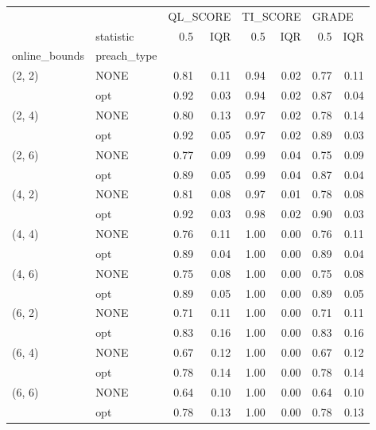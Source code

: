 \begin{tabular}{llrrrrrr}
\toprule
       & {} & \multicolumn{2}{l}{QL\_SCORE} & \multicolumn{2}{l}{TI\_SCORE} & \multicolumn{2}{l}{GRADE} \\
       & statistic &      0.5 &  IQR &      0.5 &  IQR &   0.5 &  IQR \\
online\_bounds & preach\_type &          &      &          &      &       &      \\
\midrule
(2, 2) & NONE &     0.81 & 0.11 &     0.94 & 0.02 &  0.77 & 0.11 \\
       & opt &     0.92 & 0.03 &     0.94 & 0.02 &  0.87 & 0.04 \\
(2, 4) & NONE &     0.80 & 0.13 &     0.97 & 0.02 &  0.78 & 0.14 \\
       & opt &     0.92 & 0.05 &     0.97 & 0.02 &  0.89 & 0.03 \\
(2, 6) & NONE &     0.77 & 0.09 &     0.99 & 0.04 &  0.75 & 0.09 \\
       & opt &     0.89 & 0.05 &     0.99 & 0.04 &  0.87 & 0.04 \\
(4, 2) & NONE &     0.81 & 0.08 &     0.97 & 0.01 &  0.78 & 0.08 \\
       & opt &     0.92 & 0.03 &     0.98 & 0.02 &  0.90 & 0.03 \\
(4, 4) & NONE &     0.76 & 0.11 &     1.00 & 0.00 &  0.76 & 0.11 \\
       & opt &     0.89 & 0.04 &     1.00 & 0.00 &  0.89 & 0.04 \\
(4, 6) & NONE &     0.75 & 0.08 &     1.00 & 0.00 &  0.75 & 0.08 \\
       & opt &     0.89 & 0.05 &     1.00 & 0.00 &  0.89 & 0.05 \\
(6, 2) & NONE &     0.71 & 0.11 &     1.00 & 0.00 &  0.71 & 0.11 \\
       & opt &     0.83 & 0.16 &     1.00 & 0.00 &  0.83 & 0.16 \\
(6, 4) & NONE &     0.67 & 0.12 &     1.00 & 0.00 &  0.67 & 0.12 \\
       & opt &     0.78 & 0.14 &     1.00 & 0.00 &  0.78 & 0.14 \\
(6, 6) & NONE &     0.64 & 0.10 &     1.00 & 0.00 &  0.64 & 0.10 \\
       & opt &     0.78 & 0.13 &     1.00 & 0.00 &  0.78 & 0.13 \\
\bottomrule
\end{tabular}
